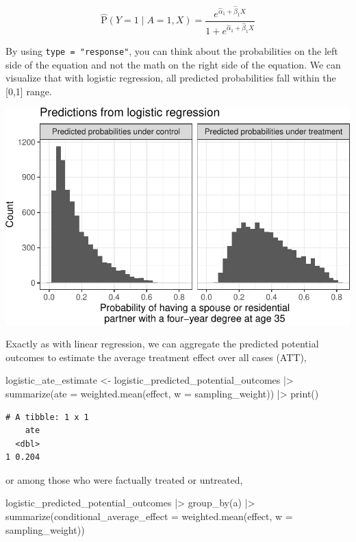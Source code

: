 \documentclass[
  letterpaper,
  DIV=11,
  numbers=noendperiod]{scrartcl}
\newenvironment{Shaded}{\begin{snugshade}}{\end{snugshade}}
\newcommand{\AttributeTok}[1]{\textcolor[rgb]{0.40,0.45,0.13}{#1}}
\newcommand{\FunctionTok}[1]{\textcolor[rgb]{0.28,0.35,0.67}{#1}}
\newcommand{\NormalTok}[1]{\textcolor[rgb]{0.00,0.23,0.31}{#1}}
\newcommand{\OtherTok}[1]{\textcolor[rgb]{0.00,0.23,0.31}{#1}}
\newcommand{\SpecialCharTok}[1]{\textcolor[rgb]{0.37,0.37,0.37}{#1}}
\begin{document}
\[
\hat{\text{P}}(Y = 1\mid A = 1, X) = \frac{e^{\hat\alpha_1 + \hat\beta_1 X}}{1 + e^{\hat\alpha_1 + \hat\beta_1 X}}
\]

By using \texttt{type\ =\ "response"}, you can think about the
probabilities on the left side of the equation and not the math on the
right side of the equation. We can visualize that with logistic
regression, all predicted probabilities fall within the {[}0,1{]} range.

\includegraphics{models_for_causal_files/figure-pdf/unnamed-chunk-22-1.pdf}

Exactly as with linear regression, we can aggregate the predicted
potential outcomes to estimate the average treatment effect over all
cases (ATT),

\begin{Shaded}
\begin{Highlighting}[]
\NormalTok{logistic\_ate\_estimate }\OtherTok{\textless{}{-}}\NormalTok{ logistic\_predicted\_potential\_outcomes }\SpecialCharTok{|\textgreater{}}
  \FunctionTok{summarize}\NormalTok{(}\AttributeTok{ate =} \FunctionTok{weighted.mean}\NormalTok{(effect, }\AttributeTok{w =}\NormalTok{ sampling\_weight)) }\SpecialCharTok{|\textgreater{}}
  \FunctionTok{print}\NormalTok{()}
\end{Highlighting}
\end{Shaded}

\begin{verbatim}
# A tibble: 1 x 1
    ate
  <dbl>
1 0.204
\end{verbatim}

or among those who were factually treated or untreated,

\begin{Shaded}
\begin{Highlighting}[]
\NormalTok{logistic\_predicted\_potential\_outcomes }\SpecialCharTok{|\textgreater{}}
  \FunctionTok{group\_by}\NormalTok{(a) }\SpecialCharTok{|\textgreater{}}
  \FunctionTok{summarize}\NormalTok{(}\AttributeTok{conditional\_average\_effect =} \FunctionTok{weighted.mean}\NormalTok{(effect, }\AttributeTok{w =}\NormalTok{ sampling\_weight))}
\end{Highlighting}
\end{Shaded}
\end{document}

